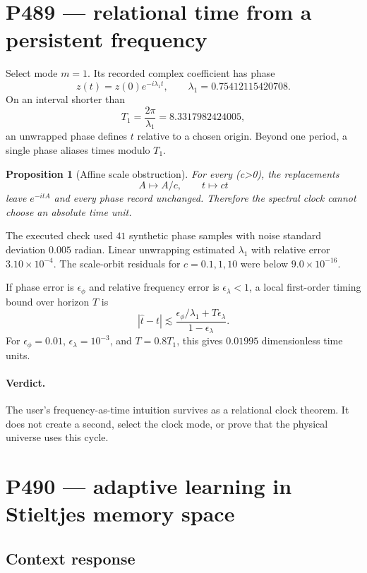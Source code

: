 \documentclass[11pt,a4paper]{article}
\newtheorem{proposition}[theorem]{Proposition}
\theoremstyle{definition}
\theoremstyle{remark}
\begin{document}
\section{P489 --- relational time from a persistent frequency}

Select mode $m=1$. Its recorded complex coefficient has phase
\[
z(t)=z(0)e^{-i\lambda_1t},
\qquad \lambda_1=0.75412115420708.
\]
On an interval shorter than
\[
T_1=\frac{2\pi}{\lambda_1}=8.3317982424005,
\]
an unwrapped phase defines $t$ relative to a chosen origin. Beyond one period, a single phase aliases times modulo $T_1$.

\begin{proposition}[Affine scale obstruction]
For every (c>0), the replacements
\[
A\mapsto A/c,
\qquad t\mapsto ct
\]
leave $e^{-itA}$ and every phase record unchanged. Therefore the spectral clock cannot choose an absolute time unit.
\end{proposition}

The executed check used $41$ synthetic phase samples with noise standard deviation $0.005$ radian. Linear unwrapping estimated $\lambda_1$ with relative error $3.10\times10^{-4}$. The scale-orbit residuals for $c=0.1,1,10$ were below $9.0\times10^{-16}$.

If phase error is $\epsilon_\phi$ and relative frequency error is $\epsilon_\lambda<1$, a local first-order timing bound over horizon $T$ is
\[
|\widehat t-t|
\lesssim
\frac{\epsilon_\phi/\lambda_1+T\epsilon_\lambda}{1-\epsilon_\lambda}.
\]
For $\epsilon_\phi=0.01$, $\epsilon_\lambda=10^{-3}$, and $T=0.8T_1$, this gives $0.01995$ dimensionless time units.

\paragraph{Verdict.}
The user's frequency-as-time intuition survives as a relational clock theorem. It does not create a second, select the clock mode, or prove that the physical universe uses this cycle.

\section{P490 --- adaptive learning in Stieltjes memory space}

\subsection{Context response}
\end{document}
